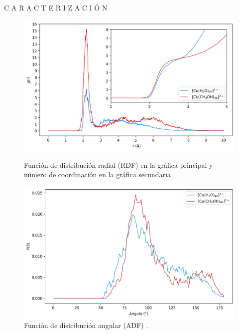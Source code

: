 \documentclass[final]{beamer}
\newlength{\colwidth}
\begin{document}
\begin{frame}[t]
\begin{columns}[t]
\begin{column}{\colwidth}
\begin{block}{C A R A C T E R I Z A C I Ó N }{}
				\begin{figure}[H]
					\centering
					\begin{minipage}[c]{0.49\textwidth} %
						\centering
						\includegraphics[width=\textwidth]{logos/RDF-OUTPUT-HISTOGRAMA.png}
						\caption{Función de distribución radial (RDF) en la gráfica principal y número de coordinación en la gráfica secundaria}
						\label{fig:rdfcu40ch4o}
					\end{minipage}%
					\hfill %
					\begin{minipage}[c]{0.49\textwidth} %
						\centering
						\includegraphics[width=\textwidth]{logos/ADF-OUTPUT-HISTOGRAMA.png}
						\caption{Función de distribución angular (ADF) .}
						\label{fig:adfcu40ch4o}
					\end{minipage}
				\end{figure}


\end{block}
\end{column}
\end{columns}
\end{frame}
\end{document}
